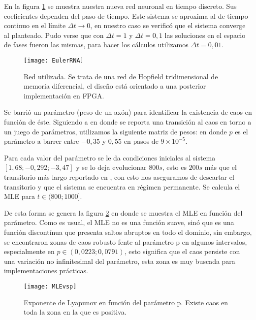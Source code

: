 En la figura \ref{fig:EulerRNA} se muestra nuestra nueva red neuronal en tiempo discreto.
Sus coeficientes dependen del paso de tiempo.
Este sistema se aproxima al de tiempo continuo en el límite $\Delta t \rightarrow 0$, en nuestro caso se verificó que el sistema converge al planteado.
Pudo verse que con $\Delta t = 1$ y $\Delta t = 0,1$ las soluciones en el espacio de fases fueron las mismas, para hacer los cálculos utilizamos $\Delta t = 0,01$.
\begin{figure}
	\centering
	\texttt{[image: EulerRNA]}\\
	\caption{Red utilizada. Se trata de una red de Hopfield tridimensional de memoria diferencial, el diseño está orientado a una posterior implementación en FPGA.}\label{fig:EulerRNA}
\end{figure}

Se barrió un parámetro (peso de un axón) para identificar la existencia de caos en función de éste.
Siguiendo a \cite{Yang2003} en donde se reporta una transición al caos en torno a un juego de parámetros, utilizamos la siguiente matriz de pesos:
en donde $p$ es el parámetro a barrer entre $-0,35$ y $0,55$ en pasos de $9\times 10^{-5}$.

Para cada valor del parámetro se le da condiciones iniciales al sistema $[1,68; -0,292; -3,47]$ y se lo deja evolucionar $800s$, esto es $200s$ más que el transitorio más largo reportado en \cite{Yang2003}, con esto nos aseguramos de descartar el transitorio y que el sistema se encuentra en régimen permanente.
Se calcula el MLE para $t \in (800;1000]$.

De esta forma se genera la figura \ref{fig:MLEvsp} en donde se muestra el MLE en función del parámetro.
Como es usual, el MLE no es una función suave, sinó que es una función discontínua que presenta saltos abruptos en todo el dominio, sin embargo, se encontraron zonas de caos robusto fente al parámetro p en algunos intervalos, especialmente en $p \in (0,0223; 0,0791)$, esto significa que el caos persiste con una variación no infinitesimal del parámetro, esta zona es muy buscada para implementaciones prácticas.
\begin{figure}
	\centering
	\texttt{[image: MLEvsp]}\\
	\caption{Exponente de Lyapunov en función del parámetro p. Existe caos en toda la zona en la que es positiva.}\label{fig:MLEvsp}
\end{figure}


